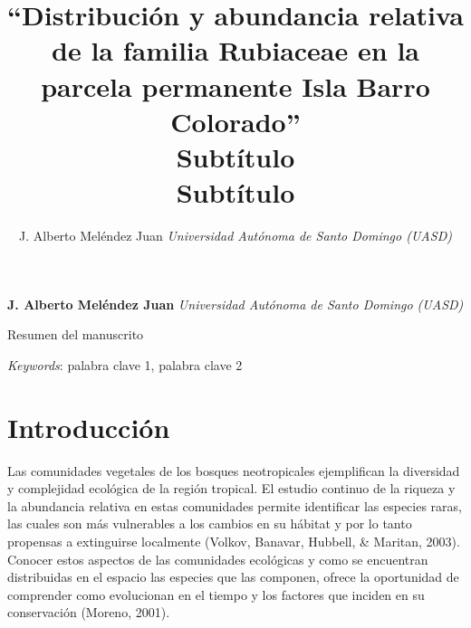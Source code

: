 \documentclass[11pt,]{article}
\title{``Distribución y abundancia relativa de la familia Rubiaceae en la
parcela permanente Isla Barro Colorado''\\
Subtítulo\\
Subtítulo  }
\author{\Large J. Alberto Meléndez Juan\vspace{0.05in} \newline\normalsize\emph{Universidad Autónoma de Santo Domingo (UASD)}  }
\date{}
\newcommand*{\authorfont}{\fontfamily{phv}\selectfont}
\renewenvironment{abstract}
 {{%
    \setlength{\leftmargin}{0mm}
    \setlength{\rightmargin}{\leftmargin}%
  }%
  \relax}
 {\endlist}
\begin{document}
	
%

{%
\setlength{\parindent}{0pt}
\thispagestyle{plain}
{\fontsize{18}{20}\selectfont\raggedright 
\maketitle  %

}

{
   \vskip 13.5pt\relax \normalsize\fontsize{11}{12} 
\textbf{\authorfont J. Alberto Meléndez Juan} \hskip 15pt \emph{\small Universidad Autónoma de Santo Domingo (UASD)}   

}

}








\begin{abstract}

    \hbox{\vrule height .2pt width 39.14pc}

    \vskip 8.5pt %

\noindent Resumen del manuscrito


\vskip 8.5pt \noindent \emph{Keywords}: palabra clave 1, palabra clave 2 \par

    \hbox{\vrule height .2pt width 39.14pc}



\end{abstract}


\vskip 6.5pt


\noindent  \section{Introducción}\label{introducciuxf3n}

Las comunidades vegetales de los bosques neotropicales ejemplifican la
diversidad y complejidad ecológica de la región tropical. El estudio
continuo de la riqueza y la abundancia relativa en estas comunidades
permite identificar las especies raras, las cuales son más vulnerables a
los cambios en su hábitat y por lo tanto propensas a extinguirse
localmente (Volkov, Banavar, Hubbell, \& Maritan, 2003). Conocer estos
aspectos de las comunidades ecológicas y como se encuentran distribuidas
en el espacio las especies que las componen, ofrece la oportunidad de
comprender como evolucionan en el tiempo y los factores que inciden en
su conservación (Moreno, 2001).
\end{document}
